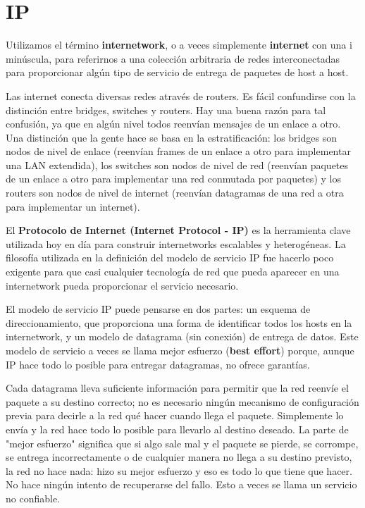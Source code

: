 \section{IP}
Utilizamos el término \textbf{internetwork}, o a veces simplemente \textbf{internet} con una i minúscula, para referirnos a una colección arbitraria de redes interconectadas para proporcionar algún tipo de servicio de entrega de paquetes de host a host.

Las internet conecta diversas redes através de routers. Es fácil confundirse con la distinción entre bridges, switches y routers. Hay una buena razón para tal confusión, ya que en algún nivel todos reenvían mensajes de un enlace a otro. Una distinción que la gente hace se basa en la estratificación: los bridges son nodos de nivel de enlace (reenvían frames de un enlace a otro para implementar una LAN extendida), los switches son nodos de nivel de red (reenvían paquetes de un enlace a otro para implementar una red conmutada por paquetes) y los routers son nodos de nivel de internet (reenvían datagramas de una red a otra para implementar un internet).

El \textbf{Protocolo de Internet (Internet Protocol - IP)} es la herramienta clave utilizada hoy en día para construir internetworks escalables y heterogéneas.
La filosofía utilizada en la definición del modelo de servicio IP fue hacerlo poco exigente para que casi cualquier tecnología de red que pueda aparecer en una internetwork pueda proporcionar el servicio necesario.

El modelo de servicio IP puede pensarse en dos partes: un esquema de direccionamiento, que proporciona una forma de identificar todos los hosts en la internetwork, y un modelo de datagrama (sin conexión) de entrega de datos. Este modelo de servicio a veces se llama mejor esfuerzo (\textbf{best effort}) porque, aunque IP hace todo lo posible para entregar datagramas, no ofrece garantías.

Cada datagrama lleva suficiente información para permitir que la red reenvíe el paquete a su destino correcto; no es necesario ningún mecanismo de configuración previa para decirle a la red qué hacer cuando llega el paquete. Simplemente lo envía y la red hace todo lo posible para llevarlo al destino deseado. La parte de "mejor esfuerzo" significa que si algo sale mal y el paquete se pierde, se corrompe, se entrega incorrectamente o de cualquier manera no llega a su destino previsto, la red no hace nada: hizo su mejor esfuerzo y eso es todo lo que tiene que hacer. No hace ningún intento de recuperarse del fallo. Esto a veces se llama un servicio no confiable.

